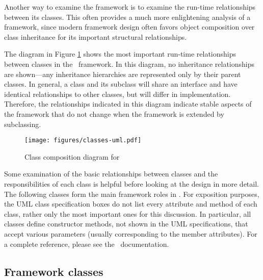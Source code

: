 Another way to examine the framework is to examine the run-time
relationships between its classes.  This often provides a much more
enlightening analysis of a framework, since modern framework design
often favors object composition over class inheritance for its
important structural relationships. \cite[p. 20]{gamma:95}

The diagram in Figure \ref{classes-uml} shows the
most important run-time relationships between classes in the
\aicat\ framework.  In this diagram, no inheritance
relationships are shown---any inheritance hierarchies are represented
only by their parent classes.  In general, a class and its subclass
will share an interface and have identical relationships to other
classes, but will differ in implementation.  Therefore, the
relationships indicated in this diagram indicate stable aspects of the
framework that do not change when the framework is extended by
subclassing.

\begin{figure}
\texttt{[image: figures/classes-uml.pdf]}
\caption{Class composition diagram for \aicat}
\label{classes-uml}
\end{figure}

Some examination of the basic relationships between classes and the
responsibilities of each class is helpful before looking at the design
in more detail.  The following classes form the main framework roles
in \aicat.  For exposition purposes, the UML class specification boxes
do not list every attribute and method of each class, rather only the
most important ones for this discussion.  In particular, all classes
define  constructor methods, not shown in the UML
specifications, that accept various parameters (usually corresponding
to the member attributes).  For a complete reference, please see the
\aicat\ documentation.

\subsection{Framework classes}

